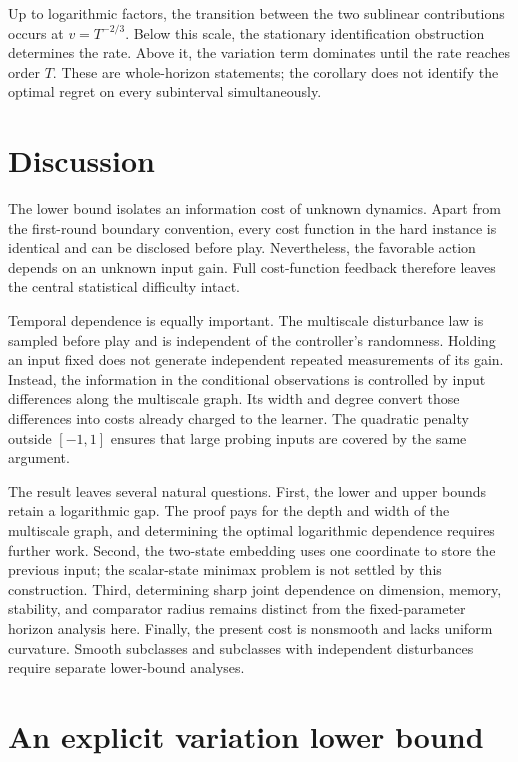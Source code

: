 \documentclass[11pt]{article}
\theoremstyle{remark}
\begin{document}
Up to logarithmic factors, the transition between the two sublinear
contributions occurs at $v=T^{-2/3}$. Below this scale, the stationary
identification obstruction determines the rate. Above it, the variation
term dominates until the rate reaches order $T$. These are whole-horizon
statements; the corollary does not identify the optimal regret on every
subinterval simultaneously.

\section{Discussion}\label{sec:discussion}

The lower bound isolates an information cost of unknown dynamics. Apart
from the first-round boundary convention, every cost function in the hard
instance is identical and can be disclosed before play. Nevertheless,
the favorable action depends on an unknown input gain. Full cost-function
feedback therefore leaves the central statistical difficulty intact.

Temporal dependence is equally important. The multiscale disturbance law
is sampled before play and is independent of the controller's randomness.
Holding an input fixed does not generate independent repeated measurements
of its gain. Instead, the information in the conditional observations is
controlled by input differences along the multiscale graph. Its width and
degree convert those differences into costs already charged to the learner.
The quadratic penalty outside $[-1,1]$ ensures that large probing inputs
are covered by the same argument.

The result leaves several natural questions. First, the lower and upper
bounds retain a logarithmic gap. The proof pays for the depth and width
of the multiscale graph, and determining the optimal logarithmic dependence
requires further work. Second, the two-state embedding uses one coordinate
to store the previous input; the scalar-state minimax problem is not
settled by this construction. Third, determining sharp joint dependence on
dimension, memory, stability, and comparator radius remains distinct from
the fixed-parameter horizon analysis here. Finally, the present cost is
nonsmooth and lacks uniform curvature. Smooth subclasses and subclasses
with independent disturbances require separate lower-bound analyses.

\appendix
\section{An explicit variation lower bound}\label{app:variation}
\end{document}
